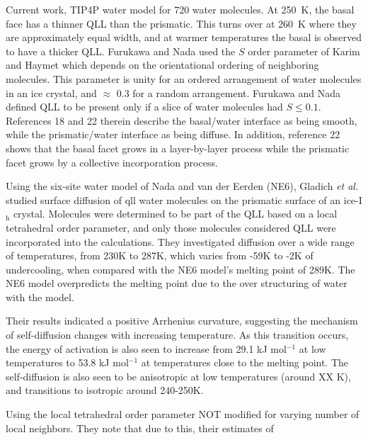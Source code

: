 Current work, TIP4P water model for 720 water molecules. At 250~K, the
basal face has a thinner QLL than the prismatic. This turns over at
260~K where they are approximately equal width, and at warmer
temperatures the basal is observed to have a thicker QLL. Furukawa and
Nada used the $S$ order parameter of Karim and Haymet which depends on
the orientational ordering of neighboring molecules.\cite{Karim1988}
This parameter is unity for an ordered arrangement of water molecules
in an ice crystal, and $\approx$ 0.3 for a random
arrangement. Furukawa and Nada defined QLL to be present only if a
slice of water molecules had $S \le 0.1$. References 18 and 22 therein
describe the basal/water interface as being smooth, while the
prismatic/water interface as being diffuse. In addition, reference 22
shows that the basal facet grows in a layer-by-layer process while the
prismatic facet grows by a collective incorporation process. 

Using the six-site water model of Nada and van der Eerden (NE6),
Gladich \textit{et al.} studied surface diffusion of qll water
molecules on the prismatic surface of an ice-I$_\mathrm{h}$
crystal.\cite{Gladich2011} Molecules were determined to be part of the
QLL based on a local tetrahedral order parameter, and only those
molecules considered QLL were incorporated into the calculations. They
investigated diffusion over a wide range of temperatures, from 230K to
287K, which varies from -59K to -2K of undercooling, when compared
with the NE6 model's melting point of 289K. The NE6 model overpredicts
the melting point due to the over structuring of water with the model.

Their results indicated a positive Arrhenius curvature, suggesting the
mechanism of self-diffusion changes with increasing temperature. As
this transition occurs, the energy of activation is also seen to
increase from 29.1 kJ mol$^{-1}$ at low temperatures to 53.8 kJ
mol$^{-1}$ at temperatures close to the melting point. The
self-diffusion is also seen to be anisotropic at low temperatures
(around XX K), and transitions to isotropic around 240-250K. 

Using the local tetrahedral order parameter NOT modified for varying
number of local neighbors. They note that due to this, their estimates
of 

